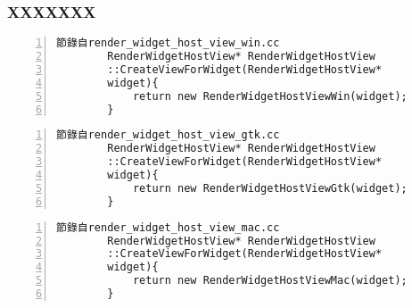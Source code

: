 \documentclass[utf8x]{beamer}
\begin{document}
\begin{frame}[fragile,t]%
\frametitle{XXXXXXX}
\begin{table}[h]
\begin{center}
\begin{minipage}{72mm}
\linespread{0.8}
\fontsize{8pt}{6pt}\selectfont
\begin{Verbatim}[numbers=left,framesep=1mm,numbersep=1pt]
	節錄自render_widget_host_view_win.cc
	    RenderWidgetHostView* RenderWidgetHostView
	    ::CreateViewForWidget(RenderWidgetHostView*
	    widget){
	        return new RenderWidgetHostViewWin(widget);
	    }
\end{Verbatim}
\end{minipage}
\end{center}
\end{table}
\begin{table}[h]
\begin{center}
\begin{minipage}{72mm}
\linespread{0.8}
\fontsize{8pt}{6pt}\selectfont
\begin{Verbatim}[numbers=left,framesep=1mm,numbersep=1pt]
	節錄自render_widget_host_view_gtk.cc
	    RenderWidgetHostView* RenderWidgetHostView
	    ::CreateViewForWidget(RenderWidgetHostView*
	    widget){
	        return new RenderWidgetHostViewGtk(widget);
	    }
\end{Verbatim}
\end{minipage}
\end{center}
\end{table}
\begin{table}[h]
\begin{center}
\begin{minipage}{72mm}
\linespread{0.8}
\fontsize{8pt}{6pt}\selectfont
\begin{Verbatim}[numbers=left,framesep=1mm,numbersep=1pt]
	節錄自render_widget_host_view_mac.cc
	    RenderWidgetHostView* RenderWidgetHostView
	    ::CreateViewForWidget(RenderWidgetHostView*
	    widget){
	        return new RenderWidgetHostViewMac(widget);
	    }
\end{Verbatim}
\end{minipage}
\end{center}
\end{table}
\end{frame}
\end{document}
